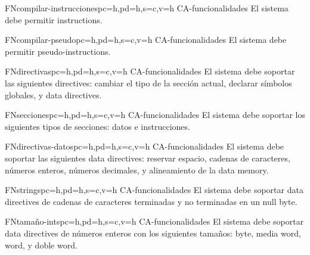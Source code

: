 \printsreqtemplate


\begin{softwareReq}{FN}{compilar-instrucciones}{pc=h,pd=h,s=c,v=h}
    {CA-funcionalidades}
    El sistema debe permitir  \glspl{instruction}.
\end{softwareReq}

\begin{softwareReq}{FN}{compilar-pseudo}{pc=h,pd=h,s=c,v=h}
    {CA-funcionalidades}
    El sistema debe permitir  \glspl{pseudo-instruction}.
\end{softwareReq}

\begin{softwareReq}{FN}{directivas}{pc=h,pd=h,s=c,v=h}
    {CA-funcionalidades}
    El sistema debe soportar las siguientes \glspl{directive}: cambiar el tipo
    de la sección actual, declarar símbolos globales, y \glspl{data directive}.
\end{softwareReq}

\begin{softwareReq}{FN}{secciones}{pc=h,pd=h,s=c,v=h}
    {CA-funcionalidades}
    El sistema debe soportar los siguientes tipos de secciones: datos e
    instrucciones.
\end{softwareReq}

\begin{softwareReq}{FN}{directivas-datos}{pc=h,pd=h,s=c,v=h}
    {CA-funcionalidades}
    El sistema debe soportar las siguientes \glspl{data directive}: reservar
    espacio, cadenas de caracteres, números enteros, números decimales, y
    alineamiento de la \gls{data memory}.
\end{softwareReq}

\begin{softwareReq}{FN}{strings}{pc=h,pd=h,s=c,v=h}
    {CA-funcionalidades}
    El sistema debe soportar \glspl{data directive} de cadenas de
    caracteres terminadas y no terminadas en un \gls{null byte}.
\end{softwareReq}

\begin{softwareReq}{FN}{tamaño-ints}{pc=h,pd=h,s=c,v=h}
    {CA-funcionalidades}
    El sistema debe soportar \glspl{data directive} de números enteros con los
    siguientes tamaños: byte, media \gls{word}, \gls{word}, y doble \gls{word}.
\end{softwareReq}


